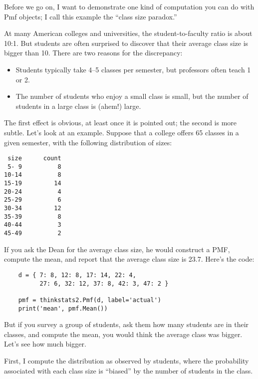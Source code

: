 \documentclass[12pt]{book}
\begin{document}
Before we go on, I want to demonstrate
one kind of computation you can do with Pmf objects; I call
this example the ``class size paradox.''

At many American colleges and universities, the student-to-faculty
ratio is about 10:1.  But students are often surprised to discover
that their average class size is bigger than 10.  There
are two reasons for the discrepancy:

\begin{itemize}

\item Students typically take 4--5 classes per semester, but
professors often teach 1 or 2.

\item The number of students who enjoy a small class is small,
but the number of students in a large class is (ahem!) large.

\end{itemize}

The first effect is obvious, at least once it is pointed out;
the second is more subtle.  Let's look at an example.  Suppose
that a college offers 65 classes in a given semester, with the
following distribution of sizes:
%
\begin{verbatim}
 size      count
 5- 9          8
10-14          8
15-19         14
20-24          4
25-29          6
30-34         12
35-39          8
40-44          3
45-49          2
\end{verbatim}

If you ask the Dean for the average class size, he would
construct a PMF, compute the mean, and report that the
average class size is 23.7.  Here's the code:

\begin{verbatim}
    d = { 7: 8, 12: 8, 17: 14, 22: 4, 
          27: 6, 32: 12, 37: 8, 42: 3, 47: 2 }

    pmf = thinkstats2.Pmf(d, label='actual')
    print('mean', pmf.Mean())
\end{verbatim}

But if you survey a group of students, ask them how many
students are in their classes, and compute the mean, you would
think the average class was bigger.  Let's see how
much bigger.

First, I compute the
distribution as observed by students, where the probability
associated with each class size is ``biased'' by the number
of students in the class.
\end{document}
